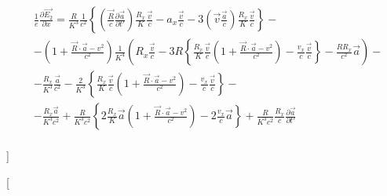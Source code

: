 \documentclass[11pt]{article}
\begin{document}
\begin{align}
  & \frac{1}{e}\frac{\partial \overrightarrow{{{E}_{2}}}}{\partial x}=\frac{R}{{{K}^{3}}}\frac{1}{{{c}^{2}}}\left\{ \left( \frac{\overrightarrow{R}}{c}\frac{\partial \overrightarrow{a}}{\partial t'} \right)\frac{{{R}_{x}}}{K}\frac{\overrightarrow{v}}{c}-{{a}_{x}}\frac{\overrightarrow{v}}{c}-3\left( \overrightarrow{v}\frac{\overrightarrow{a}}{c} \right)\frac{{{R}_{x}}}{K}\frac{\overrightarrow{v}}{c} \right\}- \\ 
 & -\left( 1+\frac{\overrightarrow{R}\cdot \overrightarrow{a}-{{v}^{2}}}{{{c}^{2}}} \right)\frac{1}{{{K}^{4}}}\left( {{R}_{x}}\frac{\overrightarrow{v}}{c}-3R\left\{ \frac{{{R}_{x}}}{K}\frac{\overrightarrow{v}}{c}\left( 1+\frac{\overrightarrow{R}\cdot \overrightarrow{a}-{{v}^{2}}}{{{c}^{2}}} \right)-\frac{{{v}_{x}}}{c}\frac{\overrightarrow{v}}{c} \right\}-\frac{R{{R}_{x}}}{{{c}^{2}}}\overrightarrow{a} \right)- \\ 
 & -\frac{{{R}_{x}}}{{{K}^{3}}}\frac{\overrightarrow{a}}{{{c}^{2}}}-\frac{2}{{{K}^{3}}}\left\{ \frac{{{R}_{x}}}{K}\frac{\overrightarrow{v}}{c}\left( 1+\frac{\overrightarrow{R}\cdot \overrightarrow{a}-{{v}^{2}}}{{{c}^{2}}} \right)-\frac{{{v}_{x}}}{c}\frac{\overrightarrow{v}}{c} \right\}- \\ 
 & -\frac{{{R}_{x}}\overrightarrow{a}}{{{K}^{3}}{{c}^{2}}}+\frac{R}{{{K}^{3}}{{c}^{2}}}\left\{ 2\frac{{{R}_{x}}}{K}\overrightarrow{a}\left( 1+\frac{\overrightarrow{R}\cdot \overrightarrow{a}-{{v}^{2}}}{{{c}^{2}}} \right)-2\frac{{{v}_{x}}}{c}\overrightarrow{a} \right\}+\frac{R}{{{K}^{3}}{{c}^{2}}}\frac{{{R}_{x}}}{c}\frac{\partial \overrightarrow{a}}{\partial t'} \\ 
\end{align}

{]}

{[}
\end{document}
